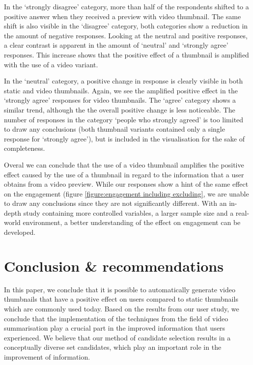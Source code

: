 \documentclass{../resources/sig-alternate-05-2015}
\begin{document}
In the `strongly disagree' category, more than half of the respondents shifted to a positive answer when they received a preview with video thumbnail. The same shift is also visible in the `disagree' category, both categories show a reduction in the amount of negative responses. Looking at the neutral and positive responses, a clear contrast is apparent in the amount of `neutral' and `strongly agree' responses. This increase shows that the positive effect of a thumbnail is amplified with the use of a video variant.

In the `neutral' category, a positive change in response is clearly visible in both static and video thumbnails. Again, we see the amplified positive effect in the `strongly agree' responses for video thumbnails. The `agree' category shows a similar trend, although the the overall positive change is less noticeable. The number of responses in the category `people who strongly agreed' is too limited to draw any conclusions (both thumbnail variants contained only a single response for `strongly agree'), but is included in the visualisation for the sake of completeness.

Overal we can conclude that the use of a video thumbnail amplifies the positive effect caused by the use of a thumbnail in regard to the information that a user obtains from a video preview. While our responses show a hint of the same effect on the engagement (figure \ref{figure:engagement including excluding}, we are unable to draw any conclusions since they are not significantly different. With an in-depth study containing more controlled variables, a larger sample size and a real-world environment, a better understanding of the effect on engagement can be developed.

\section{Conclusion \& recommendations}

In this paper, we conclude that it is possible to automatically generate video thumbnails that have a positive effect on users compared to static thumbnails which are commonly used today. Based on the results from our user study, we conclude that the implementation of the techniques from the field of video summarisation play a crucial part in the improved information that users experienced. We believe that our method of candidate selection results in a conceptually diverse set candidates, which play an important role in the improvement of information.
\end{document}

